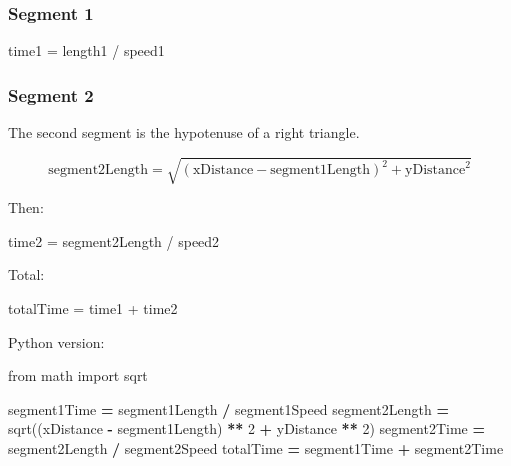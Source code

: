 \documentclass[
]{article}
\newenvironment{Shaded}{\begin{snugshade}}{\end{snugshade}}
\newcommand{\DecValTok}[1]{\textcolor[rgb]{0.00,0.00,0.81}{#1}}
\newcommand{\ImportTok}[1]{#1}
\newcommand{\NormalTok}[1]{#1}
\newcommand{\OperatorTok}[1]{\textcolor[rgb]{0.81,0.36,0.00}{\textbf{#1}}}
\begin{document}
\subsubsection{Segment 1}\label{segment-1}

\begin{Shaded}
\begin{Highlighting}[]
\NormalTok{time1 = length1 / speed1}
\end{Highlighting}
\end{Shaded}

\subsubsection{Segment 2}\label{segment-2}

The second segment is the hypotenuse of a right triangle.

\[
\text{segment2Length}
=
\sqrt{(\text{xDistance}-\text{segment1Length})^2 + \text{yDistance}^2}
\]

Then:

\begin{Shaded}
\begin{Highlighting}[]
\NormalTok{time2 = segment2Length / speed2}
\end{Highlighting}
\end{Shaded}

Total:

\begin{Shaded}
\begin{Highlighting}[]
\NormalTok{totalTime = time1 + time2}
\end{Highlighting}
\end{Shaded}

Python version:

\begin{Shaded}
\begin{Highlighting}[]
\ImportTok{from}\NormalTok{ math }\ImportTok{import}\NormalTok{ sqrt}

\NormalTok{segment1Time }\OperatorTok{=}\NormalTok{ segment1Length }\OperatorTok{/}\NormalTok{ segment1Speed}
\NormalTok{segment2Length }\OperatorTok{=}\NormalTok{ sqrt((xDistance }\OperatorTok{{-}}\NormalTok{ segment1Length) }\OperatorTok{**} \DecValTok{2} \OperatorTok{+}\NormalTok{ yDistance }\OperatorTok{**} \DecValTok{2}\NormalTok{)}
\NormalTok{segment2Time }\OperatorTok{=}\NormalTok{ segment2Length }\OperatorTok{/}\NormalTok{ segment2Speed}
\NormalTok{totalTime }\OperatorTok{=}\NormalTok{ segment1Time }\OperatorTok{+}\NormalTok{ segment2Time}
\end{Highlighting}
\end{Shaded}
\end{document}
